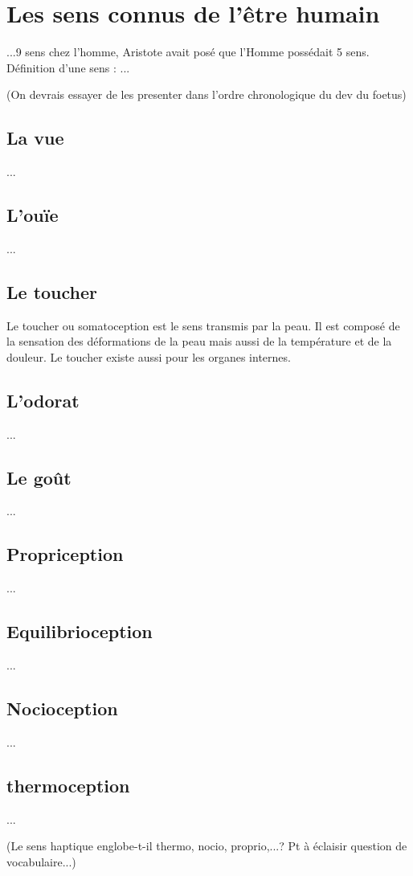 \section{Les sens connus de l'être humain}
...9 sens chez l'homme, Aristote avait posé que l'Homme possédait 5 sens.
Définition d'une sens : ...

(On devrais essayer de les presenter dans l'ordre chronologique du dev du foetus)

\subsection{La vue}
...

\subsection{L'ouïe}
...

\subsection{Le toucher}
Le toucher ou somatoception est le sens transmis par la peau. Il est composé de la sensation des déformations de la peau mais aussi de la température et de la douleur. Le toucher existe aussi pour les organes internes.\par

\subsection{L'odorat}
...

\subsection{Le goût }
...

\subsection{Propriception}
...

\subsection{Equilibrioception}
...

\subsection{Nocioception}
...

\subsection{thermoception}
...

(Le sens haptique englobe-t-il thermo, nocio, proprio,...? Pt à éclaisir question de vocabulaire...)


